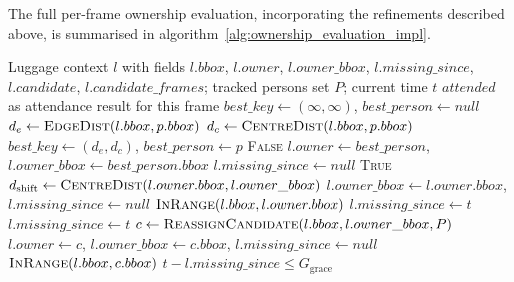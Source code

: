 The full per-frame ownership evaluation, incorporating the refinements
described above, is summarised in
algorithm~\ref{alg:ownership_evaluation_impl}.

\begin{algorithm}[!htbp]
	\caption{Per-frame ownership evaluation (implementation, replacing~\ref{alg:association}).}
	\label{alg:ownership_evaluation_impl}
	\begin{algorithmic}[1]
		\Require Luggage context $l$ with fields $l.bbox$, $l.owner$, $l.owner\_bbox$, $l.missing\_since$, $l.candidate$, $l.candidate\_frames$; tracked persons set $P$; current time $t$
		\Ensure $attended$ as attendance result for this frame
		 
		\State $best\_key \gets (\infty, \infty)$, $best\_person \gets null$
		\State $d_e \gets \Call{EdgeDist}{l.bbox, p.bbox}$ 
		\State $d_c \gets \Call{CentreDist}{l.bbox, p.bbox}$ 
		\State $best\_key \gets (d_e, d_c)$, $best\_person \gets p$
		\EndIf
		\EndFor
		 \Return \textsc{False} \EndIf
		\State $l.owner \gets best\_person$, $l.owner\_bbox \gets best\_person.bbox$
		\State $l.missing\_since \gets null$
		\State \Return \textsc{True}
		\EndIf
		\Statex
		 
		\State $d_{\text{shift}} \gets \Call{CentreDist}{l.owner.bbox, l.owner\_bbox}$
		 
		\State $l.owner\_bbox \gets l.owner.bbox$, $l.missing\_since \gets null$
		\State \Return $\Call{InRange}{l.bbox, l.owner.bbox}$ 
		\Else {}
		 \State $l.missing\_since \gets t$ \EndIf
		\EndIf
		\Else {}
		 \State $l.missing\_since \gets t$ \EndIf
		\EndIf
		\Statex
		 
		\State $c \gets \Call{ReassignCandidate}{l.bbox, l.owner\_bbox, P}$
		\State $l.owner \gets c$, $l.owner\_bbox \gets c.bbox$, $l.missing\_since \gets null$
		\State \Return $\Call{InRange}{l.bbox, c.bbox}$
		\EndIf
		\EndIf
		\State \Return $t - l.missing\_since \leq G_{\text{grace}}$ 
	\end{algorithmic}
\end{algorithm}

